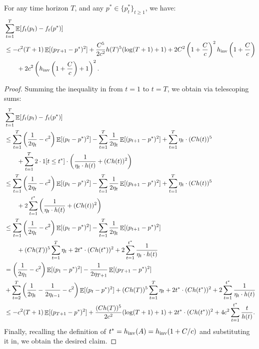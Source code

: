 \begin{claim} \label{claim:summingterms}
    For any time horizon $T$, and any $p^* \in \{p^*_t\}_{t\geq 1}$, we have:
    \begin{align*}
        &\sum_{t=1}^T \mathop{\mathbb{E}}[f_t(p_t) - f_t(p^*)] \\ 
        &\leq - c^2 (T+1) \mathop{\mathbb{E}}[(p_{T+1} - p^*)^2] + \frac{C^5}{2c^2} h(T)^5(\log (T+1) + 1)  + 2 C^2 \left(1 + \frac{C}{c} \right)^2 h_\mathrm{inv}\left(1+\frac{C}{c}\right) \\ 
        &\qquad+ 2c^2 \left(h_\mathrm{inv}\left(1+\frac{C}{c}\right) + 1\right)^2.
    \end{align*}
\end{claim}
\begin{proof}
    Summing the inequality in  from $t=1$ to $t=T$, we obtain via telescoping sums:
    \begin{align*}
        &\sum_{t=1}^T \mathop{\mathbb{E}}[f_t(p_t) - f_t(p^*)] \\
        &\leq \sum_{t=1}^T \left(\frac{1}{2\eta_t} - c^2\right) \mathop{\mathbb{E}}[(p_t - p^*)^2] - \sum_{t=1}^T \frac{1}{2 \eta_t} \mathop{\mathbb{E}}[(p_{t+1}-p^*)^2] + \sum_{t=1}^T \eta_t \cdot (C h(t))^5  \\ 
        &\qquad + \sum_{t=1}^T 2 \cdot 1[t \leq t^*] \cdot \left(\frac{1}{\eta_t \cdot h(t)} + (C h(t))^2\right) \\
        &\leq \sum_{t=1}^T \left(\frac{1}{2\eta_t} - c^2\right) \mathop{\mathbb{E}}[(p_t - p^*)^2] - \sum_{t=1}^T \frac{1}{2 \eta_t} \mathop{\mathbb{E}}[(p_{t+1}-p^*)^2] + \sum_{t=1}^T \eta_t \cdot (C h(t))^5  \\ 
        &\qquad+ 2 \sum_{t=1}^{t^*} \left(\frac{1}{\eta_t \cdot h(t)} + (C h(t))^2\right) \\
        &\leq \sum_{t=1}^T \left(\frac{1}{2\eta_t} - c^2\right) \mathop{\mathbb{E}}[(p_t - p^*)^2] - \sum_{t=1}^T \frac{1}{2 \eta_t} \mathop{\mathbb{E}}[(p_{t+1}-p^*)^2] \\ &\qquad + (C h(T))^5 \sum_{t=1}^T \eta_t  + 2 t^* \cdot (C h(t^*))^2 + 2 \sum_{t=1}^{t^*} \frac{1}{\eta_t \cdot h(t)} \\
        &= \left(\frac{1}{2\eta_1}-c^2 \right)\mathop{\mathbb{E}}[(p_1 - p^*)^2] - \frac{1}{2\eta_{T+1}} \mathop{\mathbb{E}}[(p_{T+1} - p^*)^2] \\
        &+ \sum_{t=2}^T \left(\frac{1}{2\eta_t} - \frac{1}{2\eta_{t-1}} - c^2\right) \mathop{\mathbb{E}}[(p_t - p^*)^2] + (C h(T))^5 \sum_{t=1}^T \eta_t  + 2 t^* \cdot (C h(t^*))^2 + 2 \sum_{t=1}^{t^*} \frac{1}{\eta_t \cdot h(t)} \\
        &\leq - c^2 (T+1) \mathop{\mathbb{E}}[(p_{T+1} - p^*)^2] + \frac{(C h(T))^5}{2c^2} (\log (T+1) + 1)  + 2 t^* \cdot (C h(t^*))^2 + 4c^2 \sum_{t=1}^{t^*} \frac{t}{h(t)}.
    \end{align*}
    Finally, recalling the definition of $t^* = h_\mathrm{inv}(A) = h_\mathrm{inv}(1+C/c)$ and substituting it in, we obtain the desired claim.
\end{proof}


